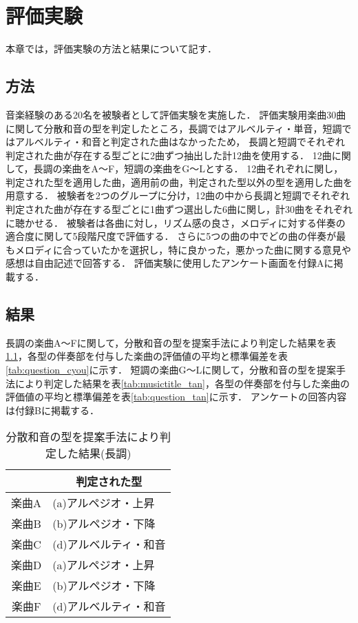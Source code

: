 \chapter{評価実験}
本章では，評価実験の方法と結果について記す．

\section{方法}
音楽経験のある20名を被験者として評価実験を実施した．
評価実験用楽曲30曲に関して分散和音の型を判定したところ，長調ではアルベルティ・単音，短調ではアルベルティ・和音と判定された曲はなかったため，
長調と短調でそれぞれ判定された曲が存在する型ごとに2曲ずつ抽出した計12曲を使用する．
12曲に関して，長調の楽曲をA〜F，短調の楽曲をG〜Lとする．
12曲それぞれに関し，判定された型を適用した曲，適用前の曲，判定された型以外の型を適用した曲を用意する．
被験者を2つのグループに分け，12曲の中から長調と短調でそれぞれ判定された曲が存在する型ごとに1曲ずつ選出した6曲に関し，計30曲をそれぞれに聴かせる．
被験者は各曲に対し，リズム感の良さ，メロディに対する伴奏の適合度に関して5段階尺度で評価する．
さらに5つの曲の中でどの曲の伴奏が最もメロディに合っていたかを選択し，特に良かった，悪かった曲に関する意見や感想は自由記述で回答する．
評価実験に使用したアンケート画面を付録Aに掲載する．

\section{結果}
長調の楽曲A〜Fに関して，分散和音の型を提案手法により判定した結果を表\ref{tab:musictitle_cyou}，各型の伴奏部を付与した楽曲の評価値の平均と標準偏差を表\ref{tab:question_cyou}に示す．
短調の楽曲G〜Lに関して，分散和音の型を提案手法により判定した結果を表\ref{tab:musictitle_tan}，各型の伴奏部を付与した楽曲の評価値の平均と標準偏差を表\ref{tab:question_tan}に示す．
アンケートの回答内容は付録Bに掲載する．

\newpage

\begin{table}[tbp]
  \caption{分散和音の型を提案手法により判定した結果(長調)}
  \label{tab:musictitle_cyou}
  \centering
  \begin{tabular}{|c|l|} \hline
       & \multicolumn{1}{|c|}{判定された型} \\ \hline
  楽曲A & (a)アルペジオ・上昇 \\ \hline
  楽曲B & (b)アルペジオ・下降 \\ \hline
  楽曲C & (d)アルベルティ・和音 \\ \hline
  楽曲D & (a)アルペジオ・上昇 \\ \hline
  楽曲E & (b)アルペジオ・下降 \\ \hline
  楽曲F & (d)アルベルティ・和音 \\ \hline
  \end{tabular}
\end{table}

